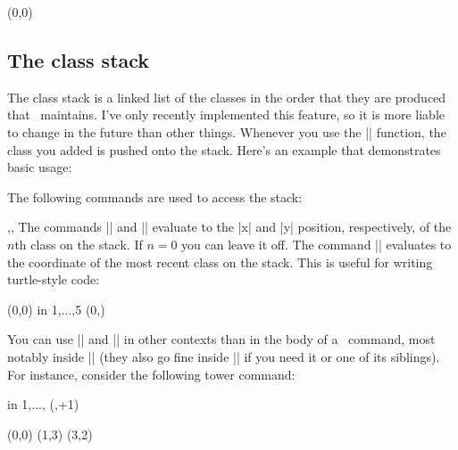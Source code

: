 \begin{sseqdata}[|| name = ex1, cohomological Serre grading]
\begin{command}{\gettag{}}
\begin{codeexample}[width=6cm]
\begin{sseqpage}[ y range = {0}{6}, x tick step = 3,
    xscale=0.6, yscale=1.3 ]
\htwotower[tag=h_2 h_0^i](0,0)
\htwotower[tag=h_2 h_0^i]
\end{sseqpage}
\end{codeexample}
\end{command}


\subsection{The class stack}
\label{sec:class stack}
The class stack is a linked list of the classes in the order that they are produced that \sseqpages\  maintains. I've only recently implemented this feature, so it is more liable to change in the future than other things. Whenever you use the |\class| function, the class you added is pushed onto the stack. Here's an example that demonstrates basic usage:


The following commands are used to access the stack:

\begin{commandlist}{\lastx{},\lasty{},\lastclass{}}
The commands |\lastx| and |\lasty| evaluate to the |x| and |y| position, respectively, of the $n$th class on the stack. If $n = 0$ you can leave it off.
The command |\lastclass| evaluates to the coordinate of the most recent class on the stack. This is useful for writing turtle-style code:
\begin{codeexample}[width=6cm]
\DeclareSseqCommand {}
\DeclareSseqCommand {}
\begin{sseqpage}
\class(0,0)
\savestack
\foreach \y in { 1,...,5 }{
    \class(0,\y)
    \structline
}
\restorestack
\etaclass\etaclass\etaclass
\divtwoclass\divtwoclass
\end{sseqpage}
\end{codeexample}

You can use |\lastx| and |\lasty| in other contexts than in the body of a \sseqpages\ command, most notably inside |\sseqparseint| (they also go fine inside |\pgfmathparse| if you need it or one of its siblings). For instance, consider the following tower command:
\begin{codeexample}[width=6cm]
\DeclareSseqCommand \tower { } {
    \savestack
    \sseqparseint{}
    \foreach \n in {1,...,\numclasses}{
        \class(\lastx,\lasty+1)
        \structline
    }
    \restorestack
}
\begin{sseqpage}[y range = {0}{5}]
\class(0,0)\tower
\class(1,3)\tower
\class(3,2)\tower
\end{sseqpage}
\end{codeexample}
\end{commandlist}



\end{sseqdata}
